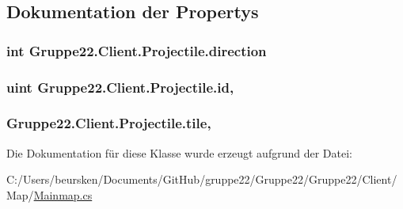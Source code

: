 \subsection{Dokumentation der Propertys}
\hypertarget{class_gruppe22_1_1_client_1_1_projectile_acb7573c8fa44d4181052c43357203115}{
\subsubsection[{direction}]{\setlength{\rightskip}{0pt plus 5cm}int Gruppe22.\-Client.\-Projectile.\-direction\hspace{0.3cm}{\ttfamily [get]}}}\label{class_gruppe22_1_1_client_1_1_projectile_acb7573c8fa44d4181052c43357203115}
\hypertarget{class_gruppe22_1_1_client_1_1_projectile_ab29686eea9206ed8e87f1d65ec1c9993}{
\subsubsection[{id}]{\setlength{\rightskip}{0pt plus 5cm}uint Gruppe22.\-Client.\-Projectile.\-id\hspace{0.3cm}{\ttfamily [get]}, {\ttfamily [set]}}}\label{class_gruppe22_1_1_client_1_1_projectile_ab29686eea9206ed8e87f1d65ec1c9993}
\hypertarget{class_gruppe22_1_1_client_1_1_projectile_a4f6302a03a806ca00bce450bb715d405}{
\subsubsection[{tile}]{ Gruppe22.\-Client.\-Projectile.\-tile\hspace{0.3cm}{\ttfamily [get]}, {\ttfamily [set]}}}\label{class_gruppe22_1_1_client_1_1_projectile_a4f6302a03a806ca00bce450bb715d405}


Die Dokumentation für diese Klasse wurde erzeugt aufgrund der Datei\-:\begin{DoxyCompactItemize}
\item 
C\-:/\-Users/beursken/\-Documents/\-Git\-Hub/gruppe22/\-Gruppe22/\-Gruppe22/\-Client/\-Map/\hyperlink{_mainmap_8cs}{Mainmap.\-cs}\end{DoxyCompactItemize}
